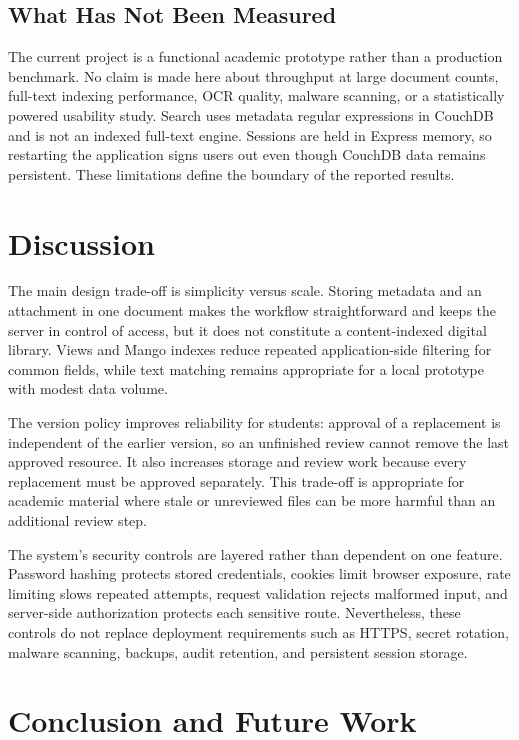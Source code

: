 \documentclass[conference]{IEEEtran}
\begin{document}
\subsection{What Has Not Been Measured}
The current project is a functional academic prototype rather than a production benchmark. No claim is made here about throughput at large document counts, full-text indexing performance, OCR quality, malware scanning, or a statistically powered usability study. Search uses metadata regular expressions in CouchDB and is not an indexed full-text engine. Sessions are held in Express memory, so restarting the application signs users out even though CouchDB data remains persistent. These limitations define the boundary of the reported results.

\section{Discussion}

The main design trade-off is simplicity versus scale. Storing metadata and an attachment in one document makes the workflow straightforward and keeps the server in control of access, but it does not constitute a content-indexed digital library. Views and Mango indexes reduce repeated application-side filtering for common fields, while text matching remains appropriate for a local prototype with modest data volume.

The version policy improves reliability for students: approval of a replacement is independent of the earlier version, so an unfinished review cannot remove the last approved resource. It also increases storage and review work because every replacement must be approved separately. This trade-off is appropriate for academic material where stale or unreviewed files can be more harmful than an additional review step.

The system's security controls are layered rather than dependent on one feature. Password hashing protects stored credentials, cookies limit browser exposure, rate limiting slows repeated attempts, request validation rejects malformed input, and server-side authorization protects each sensitive route. Nevertheless, these controls do not replace deployment requirements such as HTTPS, secret rotation, malware scanning, backups, audit retention, and persistent session storage.

\section{Conclusion and Future Work}
\end{document}
